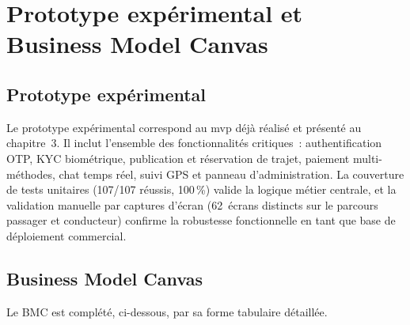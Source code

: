 \documentclass[12pt, a4paper, oneside]{report}
\begin{document}
\section{Prototype expérimental et Business Model Canvas}

\subsection{Prototype expérimental}

Le prototype expérimental correspond au \gls{mvp} déjà réalisé et présenté au chapitre~3. Il inclut l'ensemble des fonctionnalités critiques~: authentification OTP, KYC biométrique, publication et réservation de trajet, paiement multi-méthodes, chat temps réel, suivi GPS et panneau d'administration. La couverture de tests unitaires (107/107 réussis, 100\,\%) valide la logique métier centrale, et la validation manuelle par captures d'écran (62~écrans distincts sur le parcours passager et conducteur) confirme la robustesse fonctionnelle en tant que base de déploiement commercial.

\subsection{Business Model Canvas}


Le BMC est complété, ci-dessous, par sa forme tabulaire détaillée.
\end{document}
